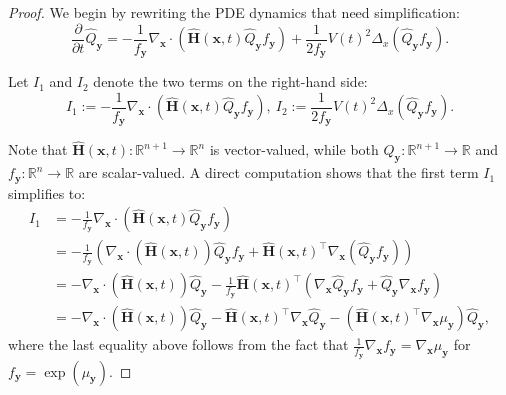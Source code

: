 \documentclass{article}
\numberwithin{equation}{section}
\def\vx{{\bm{x}}}
\def\vy{{\bm{y}}}
\def\mH{{\bm{H}}}
\begin{document}
\begin{proof}
    We begin by rewriting the PDE dynamics that need simplification:
    \begin{equation}
    \frac{\partial}{\partial t}\widehat{Q}_{\vy} = -\frac{1}{f_{\vy}}\nabla_{\vx} \cdot \left(\widehat{\mH}(\vx,t) \widehat{Q}_{\vy}f_{\vy}\right) + \frac{1}{2f_{\vy}}V(t)^2\Delta_{x}(\widehat{Q}_{\vy}f_{\vy}).    
    \end{equation}

    Let $I_1$ and $I_2$ denote the two terms on the right-hand side:
    \begin{equation}
    I_1 := -\frac{1}{f_{\vy}}\nabla_{\vx} \cdot \left(\widehat{\mH}(\vx,t) \widehat{Q}_{\vy}f_{\vy}\right), \
    I_2 := \frac{1}{2f_{\vy}}V(t)^2\Delta_{x}(\widehat{Q}_{\vy}f_{\vy}).
    \end{equation}

    Note that $\widehat{\mH}(\vx,t) :\mathbb{R}^{n+1} \rightarrow \mathbb{R}^n$ is vector-valued, while both $\widehat{Q}_{\vy}:\mathbb{R}^{n+1} \rightarrow \mathbb{R}$ and $f_{\vy}:\mathbb{R}^n \rightarrow \mathbb{R}$ are scalar-valued. A direct computation shows that the first term $I_1$ simplifies to:
    \begin{equation}
    \label{eqn: simplified I_1}
    \begin{aligned}
    I_1 &= -\frac{1}{f_{\vy}}\nabla_{\vx} \cdot \left(\widehat{\mH}(\vx,t) \widehat{Q}_{\vy}f_{\vy}\right)\\
    &=  -\frac{1}{f_{\vy}}\left(\nabla_{\vx}\cdot\left(\widehat{\mH}(\vx,t) \right)\widehat{Q}_{\vy}f_{\vy} + \widehat{\mH}(\vx,t) ^\intercal\nabla_{\vx}\left(\widehat{Q}_{\vy}f_{\vy}\right)\right)\\
    &=-\nabla_{\vx} \cdot \left(\widehat{\mH}(\vx,t)\right)\widehat{Q}_{\vy} -\frac{1}{f_{\vy}}\widehat{\mH}(\vx,t) ^\intercal\left(\nabla_{\vx}\widehat{Q}_{\vy}f_{\vy} + \widehat{Q}_{\vy}\nabla_{\vx}f_{\vy}\right)\\
    &= -\nabla_{\vx} \cdot \left(\widehat{\mH}(\vx,t)\right)\widehat{Q}_{\vy} - \widehat{\mH}(\vx,t) ^\intercal\nabla_{\vx}\widehat{Q}_{\vy}-\left(\widehat{\mH}(\vx,t) ^\intercal\nabla_{\vx}\mu_{\vy}\right)\widehat{Q}_{\vy},
    \end{aligned}    
    \end{equation}
    where the last equality above follows from the fact that $\frac{1}{f_{\vy}}\nabla_{\vx}f_{\vy} = \nabla_{\vx}\mu_{\vy}$ for $f_{\vy} = \exp(\mu_{\vy})$. 
    

\end{proof}
\end{document}
